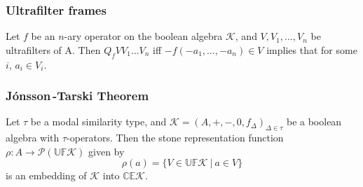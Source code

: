 \documentclass[10pt]{beamer}
\theoremstyle{definition}
\theoremstyle{definition}
\begin{document}
\begin{frame}
\frametitle{Ultrafilter frames}

\begin{lemma}
Let $f$ be an $n$-ary operator on the boolean algebra $\mathcal{K}$, and 
$V, V_1,\dots ,V_n$ be ultrafilters of A. Then
$Q_f VV_1\dots V_n$ iff $-f(-a_1,\dots ,-a_n) \in V$ implies that for some $i$, $a_i\in V_i$.
\end{lemma}



\end{frame}


\begin{frame}\label{frame: final thm}

\frametitle{J\' onsson\,-Tarski Theorem}

\begin{theorem}\label{defn: final thm}
Let $\tau$ be a modal similarity type, and
$\mathcal{K} = (A, +, -, 0, f_{\Delta})_{\Delta \in \tau}$ be a boolean algebra with 
$\tau$-operators. Then the stone representation function 
$\rho : A \to \mathcal{P}(\mathbb{UF} \mathcal{K})$ given by
$$\rho(a) = \{V \in\mathbb{UF} \mathcal{K}\ |\ a \in V \}$$
is an embedding of $\mathcal{K}$ into $\mathbb{CE}\mathcal{K}$.
\end{theorem}


\end{frame}
\end{document}
